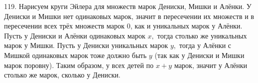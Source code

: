 119. Нарисуем круги Эйлера для множеств марок Дениски, Мишки и Алёнки. У Дениски и Мишки нет одинаковых марок, значит в пересечении их множеств и в пересечении всех трёх множеств марок 0, как и уникальных марок у Алёнки. Пусть у Дениски и Алёнки одинаковых марок $x,$ тогда столько же уникальных марок у Мишки. Пусть у Дениски уникальных марок $y,$ тогда у Алёнки с Мишкой одинаковых марок тоже должно быть $y$ (так как у Дениски и Мишки марок поровну). Таким образом, у всех детей по $x+y$ марок, значит у Алёнки столько же марок, сколько у Дениски.\\
